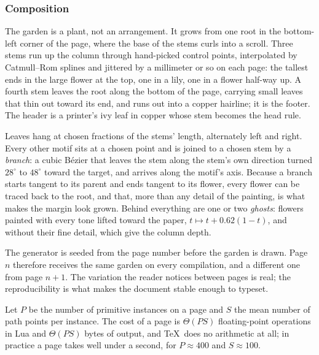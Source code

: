 \subsubsection{Composition}

The garden is a plant, not an arrangement. It grows from one root in
the bottom-left
corner of the page, where the base of the stems curls into a scroll.
Three stems run up the
column through hand-picked control points, interpolated by
Catmull--Rom splines and jittered
by a millimeter or so on each page: the tallest ends in the large
flower at the top, one in
a lily, one in a flower half-way up. A fourth stem leaves the root
along the bottom of the
page, carrying small leaves that thin out toward its end, and runs
out into a copper
hairline; it is the footer. The header is a printer's ivy leaf in
copper whose stem becomes
the head rule.

Leaves hang at chosen fractions of the stems' length, alternately
left and right. Every
other motif sits at a chosen point and is joined to a chosen stem by
a \emph{branch}: a cubic
B\'ezier that leaves the stem along the stem's own direction turned
$28^\circ$ to $48^\circ$
toward the target, and arrives along the motif's axis. Because a
branch starts tangent to
its parent and ends tangent to its flower, every flower can be traced
back to the root, and
that, more than any detail of the painting, is what makes the margin
look grown. Behind
everything are one or two \emph{ghosts}: flowers painted with every
tone lifted toward the
paper, $t\mapsto t+0.62(1-t)$, and without their fine detail, which
give the column depth.

\begin{remark}
  The generator is seeded from the page number before the garden is
  drawn. Page $n$
  therefore receives the same garden on every compilation, and a
  different one from page
  $n+1$. The variation the reader notices between pages is real; the
  reproducibility is what
  makes the document stable enough to typeset.
\end{remark}

\begin{proposition}
  Let $P$ be the number of primitive instances on a page and $S$ the
  mean number of path
  points per instance. The cost of a page is $\Theta(PS)$
  floating-point operations in Lua and
  $\Theta(PS)$ bytes of output, and \TeX\ does no arithmetic at all;
  in practice a page takes
  well under a second, for $P\approx 400$ and $S\approx 100$.
\end{proposition}

